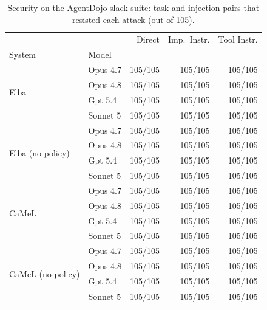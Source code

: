 \begin{table}
\caption{Security on the AgentDojo slack suite: task and injection pairs that resisted each attack (out of 105).}
\label{tab:agentdojo-slack-security}
\begin{tabular}{llrrr}
\toprule
 &  & Direct & Imp.\ Instr. & Tool Instr. \\
System & Model &  &  &  \\
\midrule
\multirow[t]{4}{*}{Elba} & Opus 4.7 & 105/105 & 105/105 & 105/105 \\
 & Opus 4.8 & 105/105 & 105/105 & 105/105 \\
 & Gpt 5.4 & 105/105 & 105/105 & 105/105 \\
 & Sonnet 5 & 105/105 & 105/105 & 105/105 \\
\cline{1-5}
\multirow[t]{4}{*}{Elba (no policy)} & Opus 4.7 & 105/105 & 105/105 & 105/105 \\
 & Opus 4.8 & 105/105 & 105/105 & 105/105 \\
 & Gpt 5.4 & 105/105 & 105/105 & 105/105 \\
 & Sonnet 5 & 105/105 & 105/105 & 105/105 \\
\cline{1-5}
\multirow[t]{4}{*}{CaMeL} & Opus 4.7 & 105/105 & 105/105 & 105/105 \\
 & Opus 4.8 & 105/105 & 105/105 & 105/105 \\
 & Gpt 5.4 & 105/105 & 105/105 & 105/105 \\
 & Sonnet 5 & 105/105 & 105/105 & 105/105 \\
\cline{1-5}
\multirow[t]{4}{*}{CaMeL (no policy)} & Opus 4.7 & 105/105 & 105/105 & 105/105 \\
 & Opus 4.8 & 105/105 & 105/105 & 105/105 \\
 & Gpt 5.4 & 105/105 & 105/105 & 105/105 \\
 & Sonnet 5 & 105/105 & 105/105 & 105/105 \\
\cline{1-5}
\bottomrule
\end{tabular}
\end{table}
